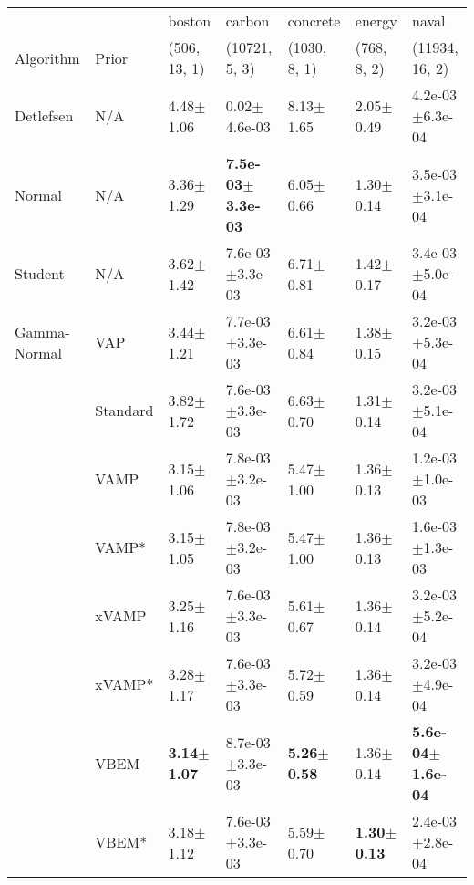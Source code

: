 \begin{tabular}{lllllll}
\toprule
             &       &                  boston &                        carbon &                concrete &                  energy &                         naval \\
Algorithm & Prior& (506, 13, 1)& (10721, 5, 3)& (1030, 8, 1)& (768, 8, 2)& (11934, 16, 2)\\
\midrule
Detlefsen & N/A &           4.48$\pm$1.06 &              0.02$\pm$4.6e-03 &           8.13$\pm$1.65 &           2.05$\pm$0.49 &           4.2e-03$\pm$6.3e-04 \\
Normal & N/A &           3.36$\pm$1.29 &  \textbf{7.5e-03$\pm$3.3e-03} &           6.05$\pm$0.66 &           1.30$\pm$0.14 &           3.5e-03$\pm$3.1e-04 \\
Student & N/A &           3.62$\pm$1.42 &           7.6e-03$\pm$3.3e-03 &           6.71$\pm$0.81 &           1.42$\pm$0.17 &           3.4e-03$\pm$5.0e-04 \\
Gamma-Normal & VAP &           3.44$\pm$1.21 &           7.7e-03$\pm$3.3e-03 &           6.61$\pm$0.84 &           1.38$\pm$0.15 &           3.2e-03$\pm$5.3e-04 \\
             & Standard &           3.82$\pm$1.72 &           7.6e-03$\pm$3.3e-03 &           6.63$\pm$0.70 &           1.31$\pm$0.14 &           3.2e-03$\pm$5.1e-04 \\
             & VAMP &           3.15$\pm$1.06 &           7.8e-03$\pm$3.2e-03 &           5.47$\pm$1.00 &           1.36$\pm$0.13 &           1.2e-03$\pm$1.0e-03 \\
             & VAMP* &           3.15$\pm$1.05 &           7.8e-03$\pm$3.2e-03 &           5.47$\pm$1.00 &           1.36$\pm$0.13 &           1.6e-03$\pm$1.3e-03 \\
             & xVAMP &           3.25$\pm$1.16 &           7.6e-03$\pm$3.3e-03 &           5.61$\pm$0.67 &           1.36$\pm$0.14 &           3.2e-03$\pm$5.2e-04 \\
             & xVAMP* &           3.28$\pm$1.17 &           7.6e-03$\pm$3.3e-03 &           5.72$\pm$0.59 &           1.36$\pm$0.14 &           3.2e-03$\pm$4.9e-04 \\
             & VBEM &  \textbf{3.14$\pm$1.07} &           8.7e-03$\pm$3.3e-03 &  \textbf{5.26$\pm$0.58} &           1.36$\pm$0.14 &  \textbf{5.6e-04$\pm$1.6e-04} \\
             & VBEM* &           3.18$\pm$1.12 &           7.6e-03$\pm$3.3e-03 &           5.59$\pm$0.70 &  \textbf{1.30$\pm$0.13} &           2.4e-03$\pm$2.8e-04 \\

\end{tabular}
